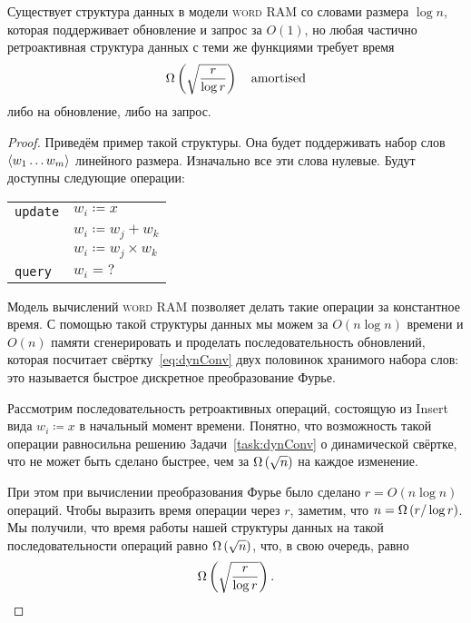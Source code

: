 \begin{theorem}
	Существует структура данных в модели {\scshape word RAM} со словами размера $\log n$, которая поддерживает обновление и запрос за $O(1)$, но любая частично ретроактивная структура данных с теми же функциями требует время
     \begin{equation*}
	\Omega \left( \sqrt{\frac{r}{\log r}} \right)\text{\quad amortised}
     \end{equation*}
	либо на обновление, либо на запрос.
\end{theorem}

\begin{proof}
	Приведём пример такой структуры. Она будет поддерживать набор слов $\left\langle w_1 \ldots w_m \right\rangle$ линейного размера. Изначально все эти слова нулевые. Будут доступны следующие операции:

\begin{center} \begin{tabular}{ll}
	{\tt update} & $w_i \coloneqq x$ \\
		& $w_i \coloneqq w_j + w_k$ \\
		& $w_i \coloneqq w_j \times w_k$ \\
	{\tt query} & $w_i = \text{?}$
\end{tabular} \end{center}

	Модель вычислений {\scshape word RAM} позволяет делать такие операции за константное время. С помощью такой структуры данных мы можем за $O(n \log n)$ времени и $O(n)$ памяти сгенерировать и проделать последовательность обновлений, которая посчитает свёртку~\eqref{eq:dynConv} двух половинок хранимого набора слов: это называется быстрое дискретное преобразование Фурье.
	
	Рассмотрим последовательность ретроактивных операций, состоящую из Insert вида $w_i \coloneqq x$ в начальный момент времени. Понятно, что возможность такой операции равносильна решению Задачи~\ref{task:dynConv} о динамической свёртке, что не может быть сделано быстрее, чем за $\Omega \left( \sqrt{n} \right)$ на каждое изменение.
	
	При этом при вычислении преобразования Фурье было сделано $r = O(n \log n)$ операций. Чтобы выразить время операции через $r$, заметим, что $n = \Omega \left( r / \log r \right)$. Мы получили, что время работы нашей структуры данных на такой последовательности операций равно $\Omega \left( \sqrt{n} \right)$, что, в свою очередь, равно
	\[ \Omega \left( \sqrt{\frac{r}{\log r}} \right). \]
\end{proof}

